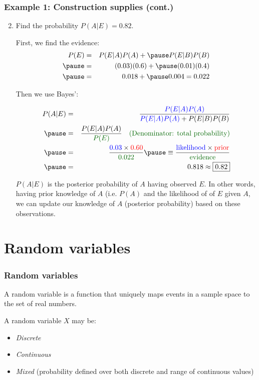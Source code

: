 \documentclass[usenames,dvipsnames,smaller]{beamer}
\newcommand{\?}{\stackrel{?}{=}}
\newcommand{\fr}{\frac}
\newcommand{\rd}{\color{red}}
\newcommand{\bl}{\color{blue}}
\newcommand{\gr}{\color{green!40!black}}
\begin{document}
   
\begin{frame}
  \frametitle{Example 1: Construction supplies (cont.)}

    \begin{enumerate}[a]\setcounter{enumi}{1}
    \item Find the probability $P(A|E) = 0.82$.

      \bigskip
      \pause
      First, we find the evidence: \pause
      {\gr
        \begin{eqnarray*}
         P(E) &=& P(E|A)P(A) + \pause P(E|B)P(B) \\ \pause
              &=& (0.03)(0.6) + \pause (0.01)(0.4) \\ \pause
              &=& 0.018 + \pause 0.004 = 0.022
       \end{eqnarray*}
     }
     
      Then we use Bayes': \pause

      \begin{eqnarray*}
        P(A|E) &=& \fr{\bl P(E|A)P(A)}{{\bl P(E|A)P(A)} + P(E|B)P(B)} \\\pause
               &=& \fr{P(E|A)P(A)}{\gr P(E)} \quad \text{\gr (Denominator: total probability)} \\ \pause
               &=& \fr{{\bl 0.03} \times {\rd 0.60}}{\gr 0.022} \pause \equiv 
                   \fr{ {\bl \text{likelihood}} \times \text{\rd prior}}{\gr \text{evidence}} \\ \pause
               &=& 0.818 \approx \boxed{0.82}
      \end{eqnarray*}
      \pause

      $P(A|E)$ is the posterior probability of $A$ having observed $E$. In other words, having prior knowledge of $A$
      (i.e. $P(A)$ and the likelihood of of $E$ given $A$, we can update our knowledge of $A$ (posterior probability)
      based on these observations.
    \end{enumerate}
 \end{frame}



 \section{Random variables}
 \begin{frame}
  \frametitle{Random variables}\pause

  A random variable is a function that uniquely maps events in a sample space to the set of real numbers. \\ \pause

  \bigskip
  
  A random variable $X$ may be: \pause

  \bigskip
  
  \begin{itemize}
  \item {\it Discrete}
  \item {\it Continuous}
  \item {\it Mixed} (probability defined over both discrete and range of continuous values)
  \end{itemize}
  
\end{frame}
 
\end{document}

